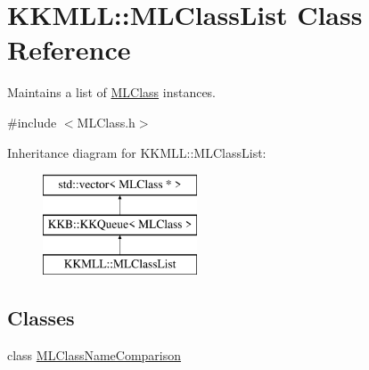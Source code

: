 \hypertarget{class_k_k_m_l_l_1_1_m_l_class_list}{}\section{K\+K\+M\+LL\+:\+:M\+L\+Class\+List Class Reference}
\label{class_k_k_m_l_l_1_1_m_l_class_list}


Maintains a list of \hyperlink{class_k_k_m_l_l_1_1_m_l_class}{M\+L\+Class} instances.  




{\ttfamily \#include $<$M\+L\+Class.\+h$>$}

Inheritance diagram for K\+K\+M\+LL\+:\+:M\+L\+Class\+List\+:\begin{figure}[H]
\begin{center}
\leavevmode
\includegraphics[height=3.000000cm]{class_k_k_m_l_l_1_1_m_l_class_list}
\end{center}
\end{figure}
\subsection*{Classes}
\begin{DoxyCompactItemize}
\item 
class \hyperlink{class_m_l_class_list_1_1_m_l_class_name_comparison}{M\+L\+Class\+Name\+Comparison}
\end{DoxyCompactItemize}
